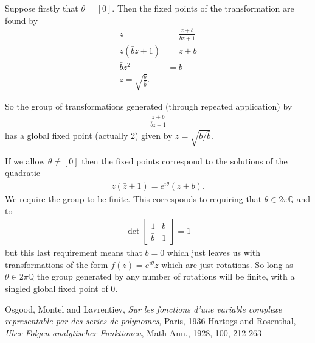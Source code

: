 \documentclass{unswmaths}
\begin{document}
Suppose firstly that $ \theta = [0] $. Then the fixed points of the transformation are found by
\begin{align}
	z 	&= \frac{z + b}{\bar{b}z + 1} \\
	z(\bar{b}z + 1) &= z + b \\
	\bar{b}z^2 &= b \\
	z = \sqrt{\frac{b}{\bar{b}}}.
\end{align}

So the group of transformations generated (through repeated application) by
\begin{align}
	\frac{z+b}{\bar{b}{z} + 1}
\end{align}
has a global fixed point (actually 2) given by $ z = \sqrt{ b / \bar{b}} $.

If we allow $ \theta \neq [0] $ then the fixed points correspond to the solutions of the quadratic
\begin{align}
	z(\bar{z} + 1) = e^{i\theta}(z+ b).
\end{align}
We require the group to be finite. This corresponds to 
requiring that $ \theta \in 2\pi \mathbb{Q} $ and to
\begin{align}
	\operatorname{det} \left[ \begin{array}{cc} 1 & b \\ \bar{b} & 1 \end{array} \right] = 1
\end{align} 
but this last requirement means that $ b = 0 $ which just leaves us with transformations of the form
$ f(z) = e^{i \theta} z $ which are just rotations. So long as $ \theta \in 2\pi\mathbb{Q} $ the group generated by any number of rotations will be finite, with a singled global fixed point of 0.

\begin{thebibliography}{9}

	Osgood, Montel and Lavrentiev,
	\emph{Sur les fonctions d'une variable complexe representable par des series de polynomes},
	Paris,
	1936
	Hartogs and Rosenthal,
	\emph{Uber Folgen analytischer Funktionen},
	Math Ann.,
	1928,
	100,
	212-263
\end{thebibliography}
\end{document}
